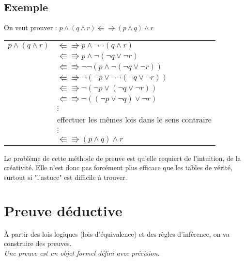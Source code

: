 			
			\subsection*{Exemple}
			On veut prouver : $p \land (q \land r) \Lleftarrow \Rrightarrow (p \land q) \land r$
			\begin{center}
			\begin{tabular}{ll}
			
			$p \land (q \land r)$ & $\Lleftarrow \Rrightarrow p \land \lnot \lnot (q \land r)$\\
			& $\Lleftarrow \Rrightarrow p \land \lnot (\lnot q \lor \lnot r)$\\
			& $\Lleftarrow \Rrightarrow \lnot \lnot (p \land \lnot (\lnot q \lor \lnot r))$\\
			& $\Lleftarrow \Rrightarrow \lnot (\lnot p \lor \lnot \lnot (\lnot q \lor \lnot r))$\\
			& $\Lleftarrow \Rrightarrow \lnot (\lnot p \lor (\lnot q \lor \lnot r))$\\
			& $\Lleftarrow \Rrightarrow \lnot ((\lnot p \lor \lnot q) \lor \lnot r)$\\
			&$\vdots$\\
			& effectuer les mêmes lois dans le sens contraire \\
			&$\vdots$\\
			& $\Lleftarrow \Rrightarrow (p \land q) \land r$\\
			\end{tabular}
			\end{center}
Le problème de cette méthode de preuve est qu'elle requiert de l'intuition, de la créativité. Elle n'est donc pas forcément plus efficace que les tables de vérité, surtout si "l'astuce" est difficile à trouver.
		
		\section{Preuve déductive}
		À partir des lois logiques (lois d'équivalence) et des règles d'inférence, on va construire des preuves.\\
		\textit{Une preuve est un objet formel défini avec précision.\\}
		
